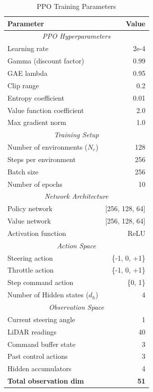 \documentclass[11pt,a4paper,twocolumn]{article}
\begin{document}
\begin{table}[h]
\centering
\caption{PPO Training Parameters}
\label{tab:training_params}
\small
\begin{tabular}{|l|r|}
\hline
\textbf{Parameter} & \textbf{Value} \\
\hline
\multicolumn{2}{|c|}{\textit{PPO Hyperparameters}} \\
\hline
Learning rate & 2e-4 \\
Gamma (discount factor) & 0.99 \\
GAE lambda & 0.95 \\
Clip range & 0.2 \\
Entropy coefficient & 0.01 \\
Value function coefficient & 2.0 \\
Max gradient norm & 1.0 \\
\hline
\multicolumn{2}{|c|}{\textit{Training Setup}} \\
\hline
Number of environments ($N_e$) & 128 \\
Steps per environment & 256 \\
Batch size & 256 \\
Number of epochs & 10 \\
\hline
\multicolumn{2}{|c|}{\textit{Network Architecture}} \\
\hline
Policy network & [256, 128, 64] \\
Value network & [256, 128, 64] \\
Activation function & ReLU \\
\hline
\multicolumn{2}{|c|}{\textit{Action Space}} \\
\hline
Steering action & \{-1, 0, +1\} \\
Throttle action & \{-1, 0, +1\} \\
Step command action & \{0, 1\} \\
Number of Hidden states ($d_h$) & 4 \\
\hline
\multicolumn{2}{|c|}{\textit{Observation Space}} \\
\hline
Current steering angle & 1 \\
LiDAR readings & 40 \\
Command buffer state & 3 \\
Past control actions & 3 \\
Hidden accumulators & 4 \\
\textbf{Total observation dim} & \textbf{51} \\
\hline
\end{tabular}
\end{table}
\end{document}
